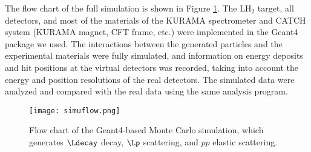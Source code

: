 The flow chart of the full simulation is shown in Figure \ref{fig-simuflow}. The LH$_{2}$ target, all detectors, and most of the materials of the KURAMA spectrometer and CATCH system (KURAMA magnet, CFT frame, etc.) were implemented in the Geant4 package we used. The interactions between the generated particles and the experimental materials were fully simulated, and information on energy deposits and hit positions at the virtual detectors was recorded, taking into account the energy and position resolutions of the real detectors. The simulated data were analyzed and compared with the real data using the same analysis program.

\begin{figure}[!h]
  \begin{center}
    \texttt{[image: simuflow.png]}
    \caption{Flow chart of the Geant4-based Monte Carlo simulation, which generates $\Ldecay$ decay, $\Lp$ scattering, and $pp$ elastic scattering.}
    \label{fig-simuflow}
  \end{center}
\end{figure}

%
